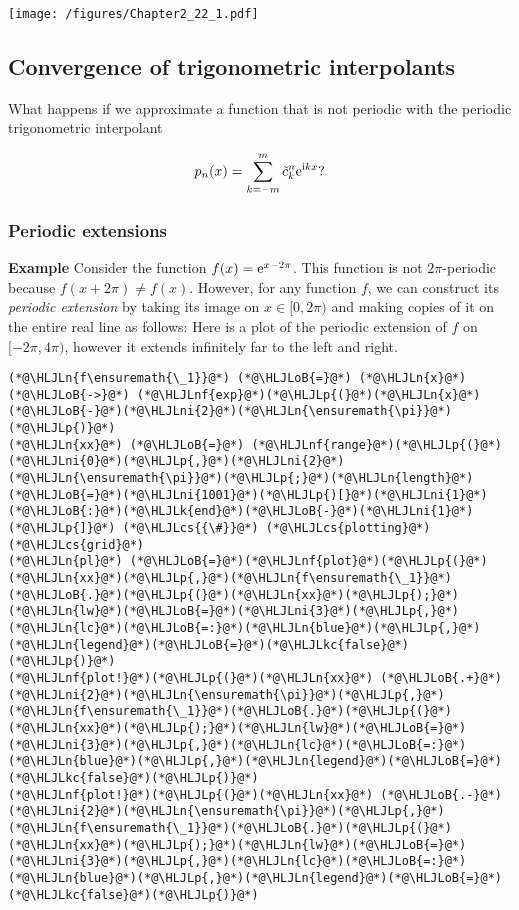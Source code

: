 \documentclass[12pt,a4paper]{article}
\newcommand{\HLJLk}[1]{\textcolor[RGB]{148,91,176}{\textbf{#1}}}
\newcommand{\HLJLkc}[1]{\textcolor[RGB]{59,151,46}{\textit{#1}}}
\newcommand{\HLJLn}[1]{#1}
\newcommand{\HLJLnf}[1]{\textcolor[RGB]{66,102,213}{#1}}
\newcommand{\HLJLni}[1]{\textcolor[RGB]{59,151,46}{#1}}
\newcommand{\HLJLoB}[1]{\textcolor[RGB]{102,102,102}{\textbf{#1}}}
\newcommand{\HLJLp}[1]{#1}
\newcommand{\HLJLcs}[1]{\textcolor[RGB]{153,153,119}{\textit{#1}}}
\begin{document}
\texttt{[image: /figures/Chapter2\_22\_1.pdf]}

\subsection{Convergence of trigonometric interpolants}
What happens if we approximate a function that is not periodic with the periodic trigonometric interpolant

\[
p_n(x) = \sum_{k=-m}^{m}\tilde{c}^n_k{\rm e}^{{\rm i}kx}?
\]
\subsubsection{Periodic extensions}
\textbf{Example} Consider the function $f(x) = {\rm e}^{x-2\pi}$. This function is not  $2\pi$-periodic because $f(x + 2\pi) \neq f(x)$. However, for any function $f$, we can construct its \emph{periodic extension} by taking its image on $x \in [0, 2\pi)$ and making copies of it on the entire real line as follows:  Here is a plot of the periodic extension of $f$ on $[-2\pi, 4\pi)$, however it extends infinitely far to the left and right.


\begin{lstlisting}
(*@\HLJLn{f\ensuremath{\_1}}@*) (*@\HLJLoB{=}@*) (*@\HLJLn{x}@*) (*@\HLJLoB{->}@*) (*@\HLJLnf{exp}@*)(*@\HLJLp{(}@*)(*@\HLJLn{x}@*)(*@\HLJLoB{-}@*)(*@\HLJLni{2}@*)(*@\HLJLn{\ensuremath{\pi}}@*)(*@\HLJLp{)}@*)
(*@\HLJLn{xx}@*) (*@\HLJLoB{=}@*) (*@\HLJLnf{range}@*)(*@\HLJLp{(}@*)(*@\HLJLni{0}@*)(*@\HLJLp{,}@*)(*@\HLJLni{2}@*)(*@\HLJLn{\ensuremath{\pi}}@*)(*@\HLJLp{;}@*)(*@\HLJLn{length}@*)(*@\HLJLoB{=}@*)(*@\HLJLni{1001}@*)(*@\HLJLp{)[}@*)(*@\HLJLni{1}@*)(*@\HLJLoB{:}@*)(*@\HLJLk{end}@*)(*@\HLJLoB{-}@*)(*@\HLJLni{1}@*)(*@\HLJLp{]}@*) (*@\HLJLcs{{\#}}@*) (*@\HLJLcs{plotting}@*) (*@\HLJLcs{grid}@*)
(*@\HLJLn{pl}@*) (*@\HLJLoB{=}@*)(*@\HLJLnf{plot}@*)(*@\HLJLp{(}@*)(*@\HLJLn{xx}@*)(*@\HLJLp{,}@*)(*@\HLJLn{f\ensuremath{\_1}}@*)(*@\HLJLoB{.}@*)(*@\HLJLp{(}@*)(*@\HLJLn{xx}@*)(*@\HLJLp{);}@*)(*@\HLJLn{lw}@*)(*@\HLJLoB{=}@*)(*@\HLJLni{3}@*)(*@\HLJLp{,}@*)(*@\HLJLn{lc}@*)(*@\HLJLoB{=:}@*)(*@\HLJLn{blue}@*)(*@\HLJLp{,}@*)(*@\HLJLn{legend}@*)(*@\HLJLoB{=}@*)(*@\HLJLkc{false}@*)(*@\HLJLp{)}@*)
(*@\HLJLnf{plot!}@*)(*@\HLJLp{(}@*)(*@\HLJLn{xx}@*) (*@\HLJLoB{.+}@*) (*@\HLJLni{2}@*)(*@\HLJLn{\ensuremath{\pi}}@*)(*@\HLJLp{,}@*)(*@\HLJLn{f\ensuremath{\_1}}@*)(*@\HLJLoB{.}@*)(*@\HLJLp{(}@*)(*@\HLJLn{xx}@*)(*@\HLJLp{);}@*)(*@\HLJLn{lw}@*)(*@\HLJLoB{=}@*)(*@\HLJLni{3}@*)(*@\HLJLp{,}@*)(*@\HLJLn{lc}@*)(*@\HLJLoB{=:}@*)(*@\HLJLn{blue}@*)(*@\HLJLp{,}@*)(*@\HLJLn{legend}@*)(*@\HLJLoB{=}@*)(*@\HLJLkc{false}@*)(*@\HLJLp{)}@*)
(*@\HLJLnf{plot!}@*)(*@\HLJLp{(}@*)(*@\HLJLn{xx}@*) (*@\HLJLoB{.-}@*) (*@\HLJLni{2}@*)(*@\HLJLn{\ensuremath{\pi}}@*)(*@\HLJLp{,}@*)(*@\HLJLn{f\ensuremath{\_1}}@*)(*@\HLJLoB{.}@*)(*@\HLJLp{(}@*)(*@\HLJLn{xx}@*)(*@\HLJLp{);}@*)(*@\HLJLn{lw}@*)(*@\HLJLoB{=}@*)(*@\HLJLni{3}@*)(*@\HLJLp{,}@*)(*@\HLJLn{lc}@*)(*@\HLJLoB{=:}@*)(*@\HLJLn{blue}@*)(*@\HLJLp{,}@*)(*@\HLJLn{legend}@*)(*@\HLJLoB{=}@*)(*@\HLJLkc{false}@*)(*@\HLJLp{)}@*)
\end{lstlisting}
\end{document}
